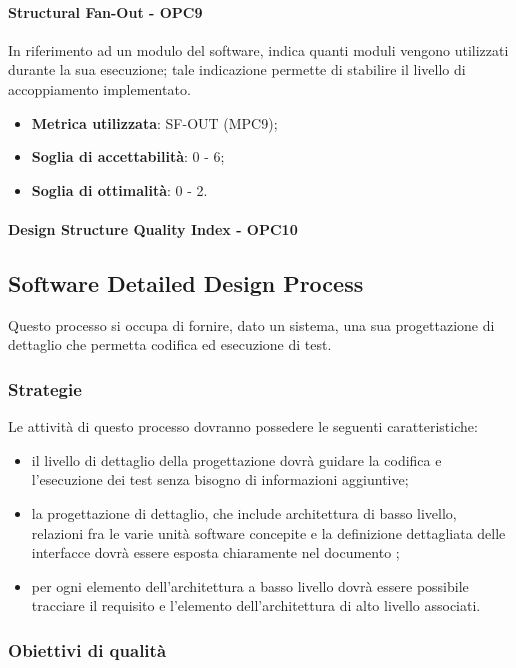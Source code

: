 \documentclass[PdQ.tex]{subfiles}
\begin{document}
			\paragraph{Structural Fan-Out - OPC9}
			In riferimento ad un modulo del software, indica quanti moduli vengono utilizzati durante la
			sua esecuzione; tale indicazione permette di stabilire il livello di accoppiamento implementato.
			\begin{itemize}
					\item \textbf{Metrica utilizzata}: SF-OUT (MPC9);
					\item \textbf{Soglia di accettabilità}: 0 - 6;
					\item \textbf{Soglia di ottimalità}: 0 - 2.
			\end{itemize}
			\paragraph{Design Structure Quality Index - OPC10}
			
			
	\subsection{Software Detailed Design Process}
		Questo processo si occupa di fornire, dato un sistema, una sua progettazione di dettaglio che permetta codifica ed esecuzione di test.	
	
		\subsubsection{Strategie}
			Le attività di questo processo dovranno possedere le seguenti caratteristiche:
			\begin{itemize}
			\item il livello di dettaglio della progettazione dovrà guidare la codifica e l'esecuzione dei test senza bisogno di informazioni aggiuntive;
			\item la progettazione di dettaglio, che include architettura di basso livello,  relazioni fra le varie unità software concepite e la definizione dettagliata delle interfacce dovrà essere esposta chiaramente nel documento \DPdoc{};
			\item per ogni elemento dell'architettura a basso livello dovrà essere possibile tracciare il requisito e l'elemento dell'architettura di alto livello associati.
			\end{itemize}
		
		\subsubsection{Obiettivi di qualità}
\end{document}
